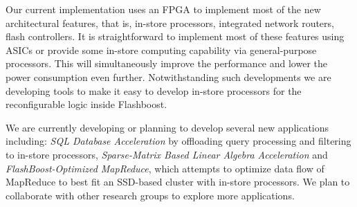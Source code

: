 \documentclass[pageno]{jpaper}
\begin{document}
Our current implementation uses an FPGA to implement most of the new
architectural features, that is, in-store processors, integrated network
routers, flash controllers. It is straightforward to implement most of these
features using ASICs or provide some in-store computing capability via
general-purpose processors. This will simultaneously improve the performance
and lower the power consumption even further. Notwithstanding such developments
we are developing tools to make it easy to develop in-store processors for the
reconfigurable logic inside Flashboost.  



We are currently developing or planning to develop several new applications
including:  
\emph{SQL Database Acceleration} by offloading query processing and
filtering to in-store processors,
\emph{Sparse-Matrix Based Linear Algebra Acceleration} and
\emph{FlashBoost-Optimized MapReduce}, which attempts to optimize data
flow of MapReduce to best fit an SSD-based cluster with in-store processors.
We plan to collaborate with other research groups to explore more applications.

\vfill
\pagebreak



\end{document}
